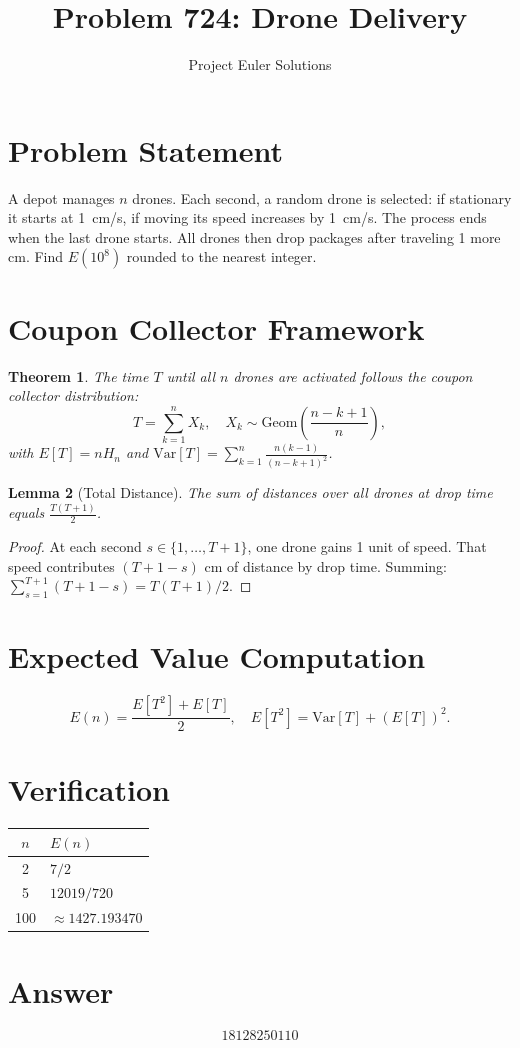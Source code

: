 \documentclass[11pt]{article}
\title{Problem 724: Drone Delivery}
\author{Project Euler Solutions}
\date{}
\newtheorem{theorem}{Theorem}
\newtheorem{lemma}[theorem]{Lemma}
\begin{document}
\maketitle

\section{Problem Statement}

A depot manages $n$ drones. Each second, a random drone is selected: if stationary it starts at 1~cm/s, if moving its speed increases by 1~cm/s. The process ends when the last drone starts. All drones then drop packages after traveling 1 more cm. Find $E(10^8)$ rounded to the nearest integer.

\section{Coupon Collector Framework}

\begin{theorem}
The time $T$ until all $n$ drones are activated follows the coupon collector distribution:
\[
T = \sum_{k=1}^{n} X_k, \quad X_k \sim \mathrm{Geom}\!\left(\frac{n-k+1}{n}\right),
\]
with $E[T] = nH_n$ and $\mathrm{Var}[T] = \sum_{k=1}^{n} \frac{n(k-1)}{(n-k+1)^2}$.
\end{theorem}

\begin{lemma}[Total Distance]
The sum of distances over all drones at drop time equals $\frac{T(T+1)}{2}$.
\end{lemma}

\begin{proof}
At each second $s \in \{1,\ldots,T+1\}$, one drone gains 1 unit of speed. That speed contributes $(T+1-s)$ cm of distance by drop time. Summing: $\sum_{s=1}^{T+1}(T+1-s) = T(T+1)/2$.
\end{proof}

\section{Expected Value Computation}

\[
E(n) = \frac{E[T^2] + E[T]}{2}, \quad E[T^2] = \mathrm{Var}[T] + (E[T])^2.
\]

\section{Verification}

\begin{center}
\begin{tabular}{cl}
\toprule
$n$ & $E(n)$ \\
\midrule
2 & $7/2$ \\
5 & $12019/720$ \\
100 & $\approx 1427.193470$ \\
\bottomrule
\end{tabular}
\end{center}

\section{Answer}

\[
\boxed{18128250110}
\]
\end{document}
